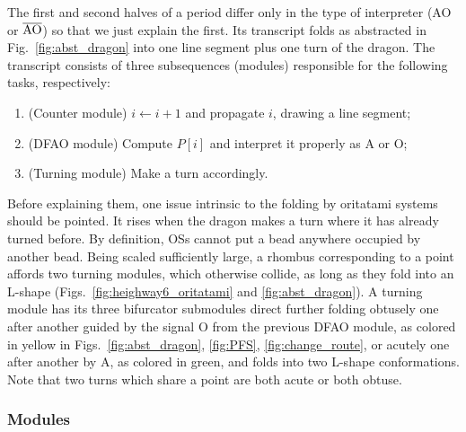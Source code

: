 The first and second halves of a period differ only in the type of interpreter (AO or $\overline{\rm AO}$) so that we just explain the first. 
Its transcript folds as abstracted in Fig.~\ref{fig:abst_dragon} into one line segment plus one turn of the dragon. 
The transcript consists of three subsequences (modules) responsible for the following tasks, respectively:  
\begin{enumerate}[itemsep=0pt]
\item (Counter module) $i \gets i + 1$ and propagate $i$, drawing a line segment;
\item (DFAO module) Compute $P[i]$ and interpret it properly as A or O;
\item (Turning module) Make a turn accordingly.
\end{enumerate}
Before explaining them, one issue intrinsic to the folding by oritatami systems should be pointed. 
It rises when the dragon makes a turn where it has already turned before. %
By definition, OSs cannot put a bead anywhere occupied by another bead. 
Being scaled sufficiently large, a rhombus corresponding to a point affords two turning modules, which otherwise collide, as long as they fold into an L-shape (Figs.~\ref{fig:heighway6_oritatami} and \ref{fig:abst_dragon}). 
A turning module has its three bifurcator submodules direct further folding obtusely one after another guided by the signal O from the previous DFAO module, as colored in yellow in Figs.~\ref{fig:abst_dragon}, \ref{fig:PFS}, \ref{fig:change_route}, or acutely one after another by A, as colored in green, and folds into two L-shape conformations. 
Note that two turns which share a point are both acute or both obtuse. 

		\subsubsection{Modules}

